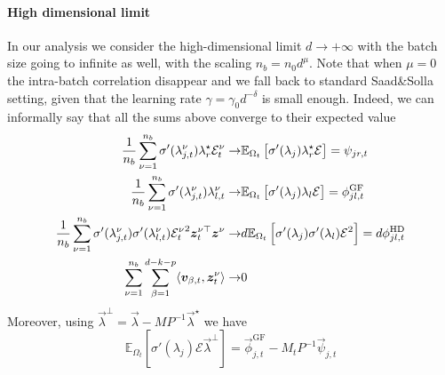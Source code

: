 \paragraph{High dimensional limit} In our analysis we consider the high-dimensional limit \(d\to+\infty\) with the batch size going to infinite as well, with the scaling \(n_b = n_0 d^\mu\). Note that when \(\mu=0\) the intra-batch correlation disappear and we fall back to standard Saad\&Solla setting, given that the learning rate \(\gamma = \gamma_0 d^{-\delta}\) is small enough. Indeed, we can informally say that all the sums above
converge to their expected value
\begin{align}
    \frac{1}{n_b} \sum_{\nu = 1}^{n_b} \sigma'(\lambda_{j,t}^\nu)\lambda^{\star}_{r} \mathcal{E}_t^{\nu} \to& \mathbb{E}_{\Omega_t}\left[ \sigma'(\lambda_j)\lambda^{\star}_{r} \mathcal{E}  \right] = \psi_{jr,t} \label{2406:eq:app:psi_def}
    \\
    \frac{1}{n_b} \sum_{\nu = 1}^{n_b} \sigma'(\lambda_{j,t}^\nu)\lambda_{l,t}^{\nu} \to& \mathbb{E}_{\Omega_t}\left[ \sigma'(\lambda_j)\lambda_{l} \mathcal{E} \right] = \phi^{\rm{GF}}_{jl,t} \label{2406:eq:app:phigf_def}
    \\
    \frac{1}{n_b}\sum_{\nu = 1}^{n_b} \sigma'(\lambda_{j,t}^\nu) \sigma'(\lambda_{l,t}^\nu){\mathcal{E}_t^\nu}^2 \vec z^{\nu\top}_t \vec z^{\nu} \to& d\mathbb{E}_{\Omega_t}\left[ \sigma'(\lambda_j)\sigma'(\lambda_l)\mathcal{E}^2\right] = d\phi_{jl,t}^\text{HD} \label{2406:eq:app:phihd_def}
    \\
    \sum_{\nu = 1}^{n_b} \sum_{\beta=1}^{d-k-p} \langle \vec v_{\beta, t}, \vec z_t^\nu\rangle \to& 0 \notag
\end{align}
Moreover, using \(\vec \lambda^\bot = \vec \lambda - MP^{-1} \vec \lambda^\star\) we have
\[
    \mathbb{E}_{\Omega_t}\left[\sigma'(\lambda_j)\mathcal E \vec\lambda^\bot\right] = \vec\phi_{j,t}^\text{GF} - M_tP^{-1}\vec \psi_{j,t}
\]

